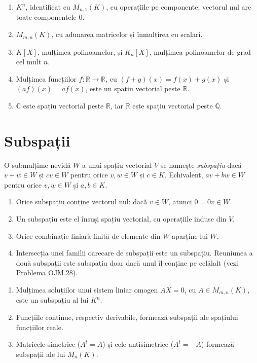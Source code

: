 \begin{exemplu}\label{ex:spatii}
\begin{enumerate}
\item $K^n$, identificat cu $M_{n,1}(K)$, cu operațiile pe componente; vectorul nul are toate componentele $0$.
\item $M_{m,n}(K)$, cu adunarea matricelor și înmulțirea cu scalari.
\item $K[X]$, mulțimea polinoamelor, și $K_n[X]$, mulțimea polinoamelor de grad cel mult $n$.
\item Mulțimea funcțiilor $f:\mathbb{R}\to\mathbb{R}$, cu $(f+g)(x)=f(x)+g(x)$ și $(af)(x)=af(x)$, este un spațiu vectorial peste $\mathbb{R}$.
\item $\mathbb{C}$ este spațiu vectorial peste $\mathbb{R}$, iar $\mathbb{R}$ este spațiu vectorial peste $\mathbb{Q}$.
\end{enumerate}
\end{exemplu}

\section{Subspații}

\begin{definitie}
O submulțime nevidă $W$ a unui spațiu vectorial $V$ se numește \emph{subspațiu} dacă $v+w\in W$ și $cv\in W$ pentru orice $v,w\in W$ și $c\in K$. Echivalent, $av+bw\in W$ pentru orice $v,w\in W$ și $a,b\in K$.
\end{definitie}

\begin{observatie}
\begin{enumerate}
\item Orice subspațiu conține vectorul nul: dacă $v\in W$, atunci $0=0v\in W$.
\item Un subspațiu este el însuși spațiu vectorial, cu operațiile induse din $V$.
\item Orice combinație liniară finită de elemente din $W$ aparține lui $W$.
\item Intersecția unei familii oarecare de subspații este un subspațiu. Reuniunea a două subspații este subspațiu doar dacă unul îl conține pe celălalt (vezi Problema OJM.28).
\end{enumerate}
\end{observatie}

\begin{exemplu}
\begin{enumerate}
\item Mulțimea soluțiilor unui sistem liniar omogen $AX=0$, cu $A\in M_{m,n}(K)$, este un subspațiu al lui $K^n$.
\item Funcțiile continue, respectiv derivabile, formează subspații ale spațiului funcțiilor reale.
\item Matricele simetrice ($A^t=A$) și cele antisimetrice ($A^t=-A$) formează subspații ale lui $M_n(K)$.
\end{enumerate}
\end{exemplu}

